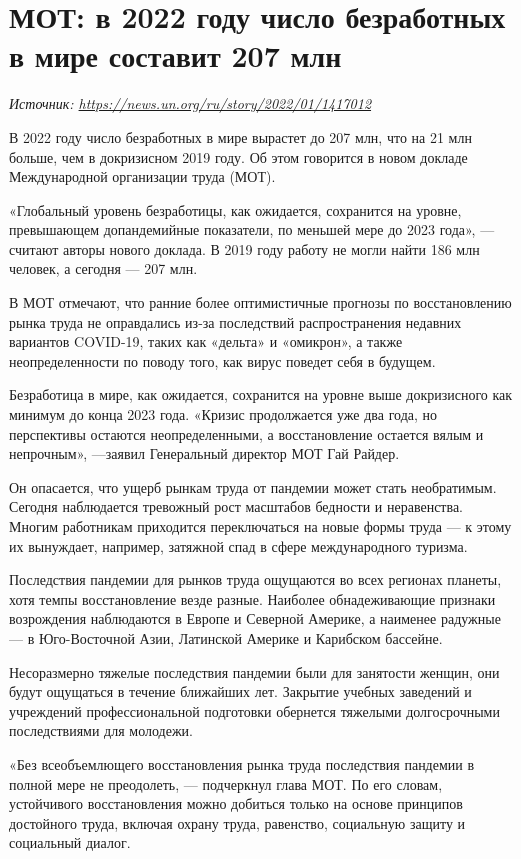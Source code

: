 \newpage
\section{МОТ: в 2022 году число безработных в мире составит 207 млн}

\textit{Источник: \url{https://news.un.org/ru/story/2022/01/1417012}}

\begin{fancyquotes}
    В 2022 году число безработных в мире вырастет до 207 млн, что на 21 млн больше, чем в докризисном 2019 году. Об этом говорится в новом докладе Международной организации труда (МОТ).
\end{fancyquotes}

«Глобальный уровень безработицы, как ожидается, сохранится на уровне, превышающем допандемийные показатели, по меньшей мере до 2023 года», — считают авторы нового доклада. В 2019 году работу не могли найти 186 млн человек, а сегодня — 207 млн.


В МОТ отмечают, что ранние более оптимистичные прогнозы по восстановлению рынка труда не оправдались из-за последствий распространения недавних вариантов COVID-19, таких как «дельта» и «омикрон», а также неопределенности по поводу того, как вирус поведет себя в будущем.

Безработица в мире, как ожидается, сохранится на уровне выше докризисного как минимум до конца 2023 года. «Кризис продолжается уже два года, но перспективы остаются неопределенными, а восстановление остается вялым и непрочным», —заявил Генеральный директор МОТ Гай Райдер.

Он опасается, что ущерб рынкам труда от пандемии может стать необратимым. Сегодня наблюдается тревожный рост масштабов бедности и неравенства. Многим работникам приходится переключаться на новые формы труда — к этому их вынуждает, например, затяжной спад в сфере международного туризма.

Последствия пандемии для рынков труда ощущаются во всех регионах планеты, хотя темпы восстановление везде разные. Наиболее обнадеживающие признаки возрождения наблюдаются в Европе и Северной Америке, а наименее радужные — в Юго-Восточной Азии, Латинской Америке и Карибском бассейне.

Несоразмерно тяжелые последствия пандемии были для занятости женщин, они будут ощущаться в течение ближайших лет. Закрытие учебных заведений и учреждений профессиональной подготовки обернется тяжелыми долгосрочными последствиями для молодежи.

«Без всеобъемлющего восстановления рынка труда последствия пандемии в полной мере не преодолеть, — подчеркнул глава МОТ. По его словам, устойчивого восстановления можно добиться только на основе принципов достойного труда, включая охрану труда, равенство, социальную защиту и социальный диалог.

